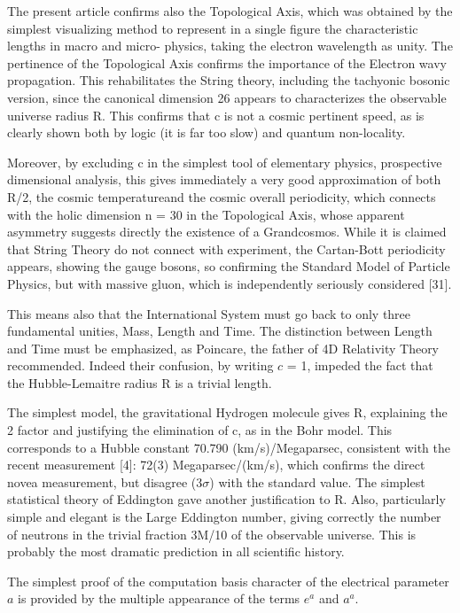 \documentclass[twoside,draft]{article}
\begin{document}
\begin{sloppypar}
{The present article confirms also the Topological Axis, which was obtained by the simplest
visualizing method to represent in a single figure the characteristic lengths in macro and micro-
physics, taking the electron wavelength as unity. The pertinence of the Topological Axis confirms
the importance of the Electron wavy propagation. This rehabilitates the String theory, including the
tachyonic bosonic version, since the canonical dimension 26 appears to characterizes the observable
universe radius R. This confirms that c is not a cosmic pertinent speed, as is clearly shown both by
logic (it is far too slow) and quantum non-locality.

Moreover, by excluding c in the simplest tool of elementary physics, prospective dimensional
analysis, this gives immediately a very good approximation of both R/2, the cosmic temperatureand the cosmic overall periodicity, which connects with the holic dimension n = 30 in the
Topological Axis, whose apparent asymmetry suggests directly the existence of a Grandcosmos.
While it is claimed that String Theory do not connect with experiment, the Cartan-Bott periodicity
appears, showing the gauge bosons, so confirming the Standard Model of Particle Physics, but with
massive gluon, which is independently seriously considered [31].

This means also that the International System must go back to only three fundamental unities,
Mass, Length and Time. The distinction between Length and Time must be emphasized, as
Poincare, the father of 4D Relativity Theory recommended. Indeed their confusion, by writing $c$ =
1, impeded the fact that the Hubble-Lemaitre radius R is a trivial length.

The simplest model, the gravitational Hydrogen molecule gives R, explaining the 2 factor and
justifying the elimination of c, as in the Bohr model. This corresponds to a Hubble constant 70.790
(km/s)/Megaparsec, consistent with the recent measurement [4]: 72(3) Megaparsec/(km/s), which
confirms the direct novea measurement, but disagree (3$\sigma$) with the standard value.
The simplest statistical theory of Eddington gave another justification to R. Also, particularly
simple and elegant is the Large Eddington number, giving correctly the number of neutrons in the
trivial fraction 3M/10 of the observable universe. This is probably the most dramatic prediction in
all scientific history.

The simplest proof of the computation basis character of the electrical parameter $a$ is provided
by the multiple appearance of the terms $e^{a}$ and $a^{a}$.

}
\end{sloppypar}
\end{document}
